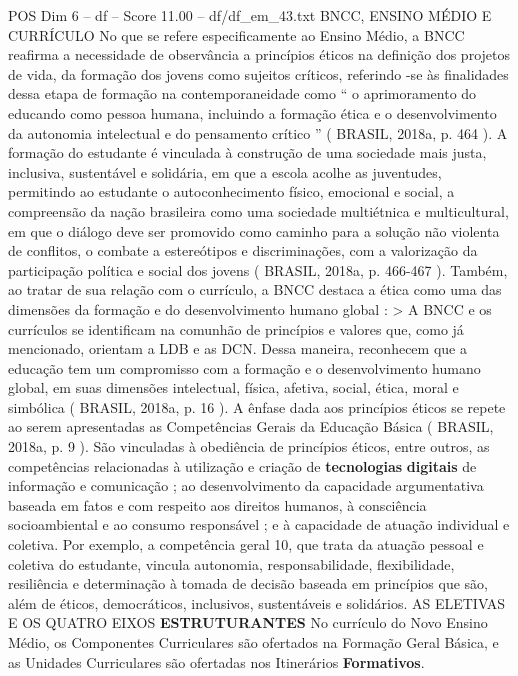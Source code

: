 \begin{textsample}{POS Dim 6 – df – Score 11.00 – df/df\_em\_43.txt}  \label{ex:f6_pos_121}
BNCC, ENSINO MÉDIO E CURRÍCULO No que se refere especificamente ao Ensino Médio, a BNCC reafirma a necessidade de observância a princípios éticos na definição dos projetos de vida, da formação dos jovens como sujeitos críticos, referindo -se às finalidades dessa etapa de formação na contemporaneidade como “ o aprimoramento do educando como pessoa humana, incluindo a formação ética e o desenvolvimento da autonomia intelectual e do pensamento crítico ” ( BRASIL, 2018a, p. 464 ).
A formação do estudante é vinculada à construção de uma sociedade mais justa, inclusiva, sustentável e solidária, em que a escola acolhe as juventudes, permitindo ao estudante o autoconhecimento físico, emocional e social, a compreensão da nação brasileira como uma sociedade multiétnica e multicultural, em que o diálogo deve ser promovido como caminho para a solução não violenta de conflitos, o combate a estereótipos e discriminações, com a valorização da participação política e social dos jovens ( BRASIL, 2018a, p. 466-467 ).
Também, ao tratar de sua relação com o currículo, a BNCC destaca a ética como uma das dimensões da formação e do desenvolvimento humano global : > A BNCC e os currículos se identificam na comunhão de princípios e valores que, como já mencionado, orientam a LDB e as DCN.
Dessa maneira, reconhecem que a educação tem um compromisso com a formação e o desenvolvimento humano global, em suas dimensões intelectual, física, afetiva, social, ética, moral e simbólica ( BRASIL, 2018a, p. 16 ).
A ênfase dada aos princípios éticos se repete ao serem apresentadas as Competências Gerais da Educação Básica ( BRASIL, 2018a, p. 9 ).
São vinculadas à obediência de princípios éticos, entre outros, as competências relacionadas à utilização e criação de \textbf{tecnologias} \textbf{digitais} de informação e comunicação ; ao desenvolvimento da capacidade argumentativa baseada em fatos e com respeito aos direitos humanos, à consciência socioambiental e ao consumo responsável ; e à capacidade de atuação individual e coletiva.
Por exemplo, a competência geral 10, que trata da atuação pessoal e coletiva do estudante, vincula autonomia, responsabilidade, flexibilidade, resiliência e determinação à tomada de decisão baseada em princípios que são, além de éticos, democráticos, inclusivos, sustentáveis e solidários.
AS ELETIVAS E OS QUATRO EIXOS \textbf{ESTRUTURANTES} No currículo do Novo Ensino Médio, os Componentes Curriculares são ofertados na Formação Geral Básica, e as Unidades Curriculares são ofertadas nos Itinerários \textbf{Formativos}.

\end{textsample}
